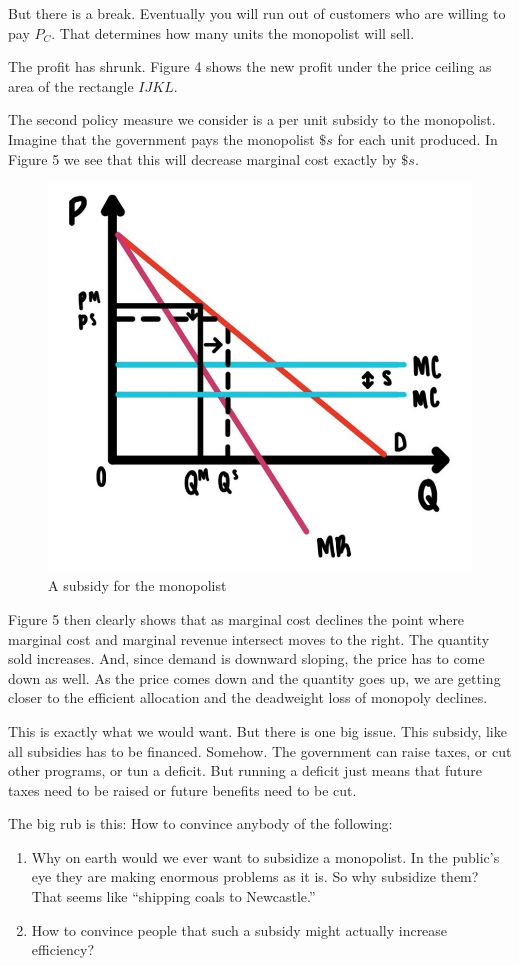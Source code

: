 \documentclass[
]{book}
\providecommand{\tightlist}{%
  \setlength{\itemsep}{0pt}\setlength{\parskip}{0pt}}
\begin{document}
But there is a break. Eventually you will run out of customers who are willing to pay \(P_C\). That determines how many units the monopolist will sell.

The profit has shrunk. Figure 4 shows the new profit under the price ceiling as area of the rectangle \(IJKL\).

The second policy measure we consider is a per unit subsidy to the monopolist. Imagine that the government pays the monopolist \(\$s\) for each unit produced. In Figure 5 we see that this will decrease marginal cost exactly by \(\$s\).

\begin{figure}

{\centering \includegraphics[width=0.5\linewidth]{img/ch6/fig6} 

}

\caption{A subsidy for the monopolist}\label{fig:fig606}
\end{figure}

Figure 5 then clearly shows that as marginal cost declines the point where marginal cost and marginal revenue intersect moves to the right. The quantity sold increases. And, since demand is downward sloping, the price has to come down as well. As the price comes down and the quantity goes up, we are getting closer to the efficient allocation and the deadweight loss of monopoly declines.

This is exactly what we would want. But there is one big issue. This subsidy, like all subsidies has to be financed. Somehow. The government can raise taxes, or cut other programs, or tun a deficit. But running a deficit just means that future taxes need to be raised or future benefits need to be cut.

The big rub is this: How to convince anybody of the following:

\begin{enumerate}
\def\labelenumi{\arabic{enumi}.}
\tightlist
\item
  Why on earth would we ever want to subsidize a monopolist. In the public's eye they are making enormous problems as it is. So why subsidize them? That seems like ``shipping coals to Newcastle.''
\item
  How to convince people that such a subsidy might actually increase efficiency?
\end{enumerate}
\end{document}
